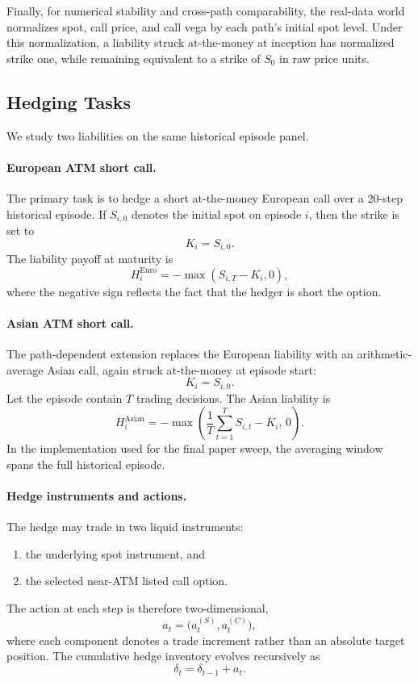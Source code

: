 \documentclass[sigconf]{acmart}
\begin{document}
Finally, for numerical stability and cross-path comparability, the real-data world normalizes spot, call price, and call vega by each path's initial spot level. Under this normalization, a liability struck at-the-money at inception has normalized strike one, while remaining equivalent to a strike of $S_0$ in raw price units.

\subsection{Hedging Tasks}
\label{subsec:hedging_tasks}

We study two liabilities on the same historical episode panel.

\paragraph{European ATM short call.}
The primary task is to hedge a short at-the-money European call over a 20-step historical episode. If $S_{i,0}$ denotes the initial spot on episode $i$, then the strike is set to
\[
K_i = S_{i,0}.
\]
The liability payoff at maturity is
\[
H_i^{\mathrm{Euro}} = -\max(S_{i,T} - K_i, 0),
\]
where the negative sign reflects the fact that the hedger is short the option.

\paragraph{Asian ATM short call.}
The path-dependent extension replaces the European liability with an arithmetic-average Asian call, again struck at-the-money at episode start:
\[
K_i = S_{i,0}.
\]
Let the episode contain $T$ trading decisions. The Asian liability is
\[
H_i^{\mathrm{Asian}} = -\max\!\left(\frac{1}{T}\sum_{t=1}^{T} S_{i,t} - K_i,\, 0\right).
\]
In the implementation used for the final paper sweep, the averaging window spans the full historical episode.

\paragraph{Hedge instruments and actions.}
The hedge may trade in two liquid instruments:
\begin{enumerate}
    \item the underlying spot instrument, and
    \item the selected near-ATM listed call option.
\end{enumerate}
The action at each step is therefore two-dimensional,
\[
a_t = \bigl(a_t^{(S)}, a_t^{(C)}\bigr),
\]
where each component denotes a trade increment rather than an absolute target position. The cumulative hedge inventory evolves recursively as
\[
\delta_t = \delta_{t-1} + a_t.
\]
\end{document}
